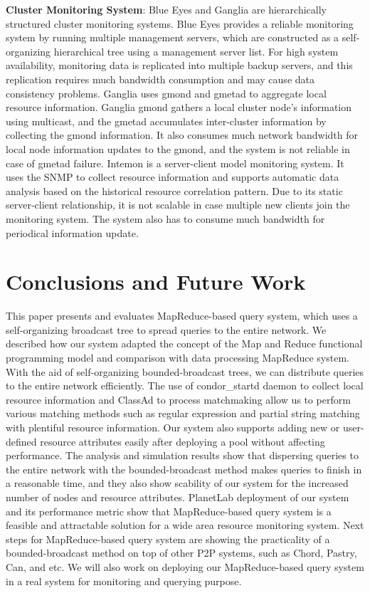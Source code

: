 \documentclass{acm_proc_article-sp}
\begin{document}
\textbf{Cluster Monitoring System}: Blue Eyes\cite{blueeyes} and Ganglia\cite{ganglia} are hierarchically structured cluster monitoring systems. 
Blue Eyes\cite{blueeyes} provides a reliable monitoring system by running multiple management servers, which are constructed as a self-organizing hierarchical tree using a management server list. 
For high system availability, monitoring data is replicated into multiple backup servers, and this replication requires much bandwidth consumption and may cause data consistency problems.
Ganglia\cite{ganglia} uses gmond and gmetad to aggregate local resource information. 
Ganglia gmond gathers a local cluster node's information using multicast, and the gmetad accumulates inter-cluster information by collecting the gmond information.
It also consumes much network bandwidth for local node information updates to the gmond, and the system is not reliable in case of gmetad failure.
Intemon\cite{intemon} is a server-client model monitoring system. It uses the SNMP to collect resource information and supports automatic data analysis based on the historical resource correlation pattern.
Due to its static server-client relationship, it is not scalable in case multiple new clients join the monitoring system. The system also has to consume much bandwidth for periodical information update.
\section{Conclusions and Future Work}
This paper presents and evaluates MapReduce-based query system, which uses a self-organizing broadcast tree to spread queries to the entire network.
We described how our system adapted the concept of the Map and Reduce functional programming model and comparison with data processing MapReduce system.
With the aid of self-organizing bounded-broadcast trees, we can distribute queries to the entire network efficiently. 
The use of condor\_startd daemon to collect local resource information and ClassAd to process matchmaking allow us to perform various matching methods such as regular expression and  partial string matching with plentiful resource information.
Our system also supports adding new or user-defined resource attributes easily after deploying a pool without affecting performance.
The analysis and simulation results show that dispersing queries to the entire network with the bounded-broadcast method makes queries to finish in a reasonable time, 
and they also show scability of our system for the increased number of nodes and resource attributes.
PlanetLab deployment of our system and its performance metric show that MapReduce-based query system is a feasible and attractable solution for a wide area resource monitoring system.
Next steps for MapReduce-based query system are showing the practicality of a bounded-broadcast method on top of other P2P systems, such as Chord, Pastry, Can, and etc.
We will also work on deploying our MapReduce-based query system in a real system for monitoring and querying purpose.


\balancecolumns
\end{document}
